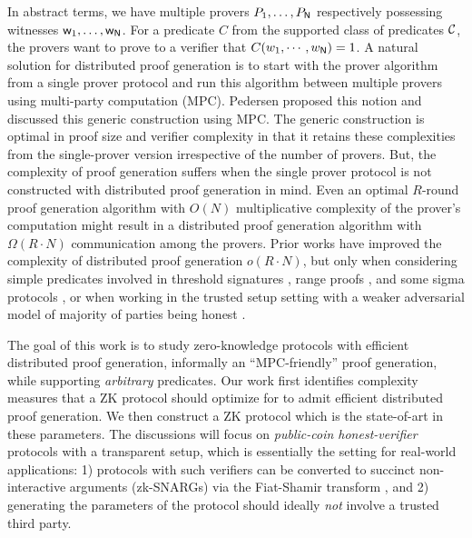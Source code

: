 In abstract terms, we have multiple provers $P_1, \ldots, P_{\mathsf{N}}$ respectively possessing witnesses $\mathsf{w}_1, \ldots, \mathsf{w}_{\mathsf{N}}$. For a predicate $C$ from the supported class of predicates ${\mathcal{C}}$, the provers want to prove to a verifier that $C(w_1,\cdots,w_{\mathsf{N}}) = 1$.
A natural solution for distributed proof generation is to start with the prover algorithm from a single prover protocol and run this algorithm between multiple provers using multi-party computation (MPC). Pedersen \cite{Ped92} proposed this notion and discussed this generic construction using MPC.
The generic construction is optimal in proof size and verifier complexity in that it retains these complexities from the single-prover version irrespective of the number of provers. But, the complexity of proof generation suffers when the single prover protocol is not constructed with distributed proof generation in mind. Even an optimal $R$-round proof generation algorithm with $O(N)$ multiplicative complexity of the prover's computation  might result in a distributed proof generation algorithm with $\Omega(R \cdot N)$ communication among the provers.
Prior works have improved the complexity of distributed proof generation $o(R \cdot N)$, but only when considering simple predicates involved in threshold signatures \cite{DDS}, range proofs \cite{bulletproofs}, and some sigma protocols \cite{EfficientTZ}, or when working in the trusted setup setting with a weaker adversarial model of majority of parties being honest \cite{trinocchio}.

The goal of this work is to study zero-knowledge protocols with efficient distributed proof generation, informally an ``MPC-friendly'' proof generation, while supporting \textit{arbitrary} predicates. %
Our work first identifies complexity measures that a ZK protocol should optimize for to admit efficient distributed proof generation. We then construct a ZK protocol which is the state-of-art in these parameters. The discussions will focus on {\em public-coin honest-verifier} protocols with a transparent setup, which is essentially the setting for real-world applications: 1) protocols with such verifiers can be converted to succinct non-interactive  arguments (zk-SNARGs)  via the Fiat-Shamir transform \cite{FS86, BCS16}, and  2) generating the parameters of the protocol should ideally {\em not} involve a trusted third party. %

